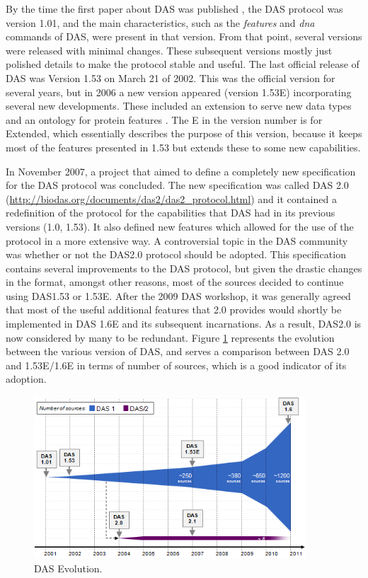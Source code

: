 By the time the first paper about DAS was published \cite{DOW2001}, the DAS protocol was version 1.01, and the main characteristics, such as the \emph{features} and \emph{dna} commands of DAS, were present in that version. From that point, several versions were released with minimal changes. These subsequent versions mostly just polished details to make the protocol stable and useful. The last official release of DAS was Version 1.53 on March 21 of 2002. This was the official version for several years, but in 2006 a new version appeared (version 1.53E) incorporating several new developments. These included an extension to serve new data types and an ontology for protein features \cite{JEN2008}. The E in the version number is for Extended, which essentially describes the purpose of this version, because it keeps most of the features presented in 1.53 but extends these to some new capabilities.

In November 2007, a project that aimed to define a completely new specification for the DAS protocol was concluded. The new specification was called DAS 2.0 (\url{http://biodas.org/documents/das2/das2\_protocol.html}) and it contained a redefinition of the protocol for the capabilities that DAS had in its previous versions (1.0, 1.53). It also defined new features which allowed for the use of the protocol in a more extensive way. A controversial topic in the DAS community was whether or not the DAS2.0 protocol should be adopted. This specification contains several improvements to the DAS protocol, but given the drastic changes in the format, amongst other reasons, most of the sources decided to continue using DAS1.53 or 1.53E. After the 2009 DAS workshop, it was generally agreed that most of the useful additional features that 2.0 provides would shortly be implemented in DAS 1.6E and its subsequent incarnations. As a result, DAS2.0 is now considered by many to be redundant. Figure \ref{fig:dasevolution} represents the evolution between the various version of DAS, and serves a comparison between DAS 2.0 and 1.53E/1.6E in terms of number of sources, which is a good indicator of its adoption.

\begin{figure}  
\centering
\includegraphics[width=4in]{figures/DasEvolution2.PNG}
\caption[DAS Evolution.]{DAS Evolution.
\label{fig:dasevolution}}
\end{figure}

